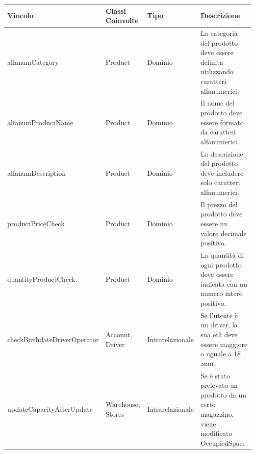 \begin{tabularx}{\textwidth}{YYYY}
  \toprule
  \textbf{Vincolo} & \textbf{Classi Coinvolte} & \textbf{Tipo} & \textbf{Descrizione} \\
  \midrule
  alfanumCategory & Product & Dominio &
  \begin{minipage}[c]{\linewidth}
    \vspace{0.5cm}
    La categoria del prodotto deve essere definita utilizzando caratteri alfanumerici. \newline
  \end{minipage} \\
  alfanumProductName & Product & Dominio &
  \begin{minipage}[c]{\linewidth}
    \vspace{0.5cm}
    Il nome del prodotto deve essere formato da caratteri alfanumerici. \newline
  \end{minipage} \\
  alfanumDescription & Product & Dominio &
  \begin{minipage}[c]{\linewidth}
    \vspace{0.5cm}
    La descrizione del prodotto deve includere solo caratteri alfanumerici. \newline
  \end{minipage} \\
  productPriceCheck & Product & Dominio &
  \begin{minipage}[c]{\linewidth}
    \vspace{0.5cm}
    Il prezzo del prodotto deve essere un valore decimale positivo. \newline
  \end{minipage} \\
  quantityProductCheck & Product & Dominio &
  \begin{minipage}[c]{\linewidth}
    \vspace{0.5cm}
    La quantità di ogni prodotto deve essere indicata con un numero intero positivo. \newline
  \end{minipage} \\
  checkBirthdateDriverOperator & Account, Driver & Intrarelazionale &
  \begin{minipage}[c]{\linewidth}
    \vspace{0.5cm}
    Se l'utente è un driver, la sua età deve essere maggiore o uguale a 18 anni. \newline
  \end{minipage} \\
  updateCapacityAfterUpdate & Warehouse, Stores& Intrarelazionale &
  \begin{minipage}[c]{\linewidth}
    \vspace{0.5cm}
    Se è stato prelevato un prodotto da un certo magazzino, viene modificato OccupiedSpace \newline
  \end{minipage} \\
  \bottomrule
\end{tabularx}
